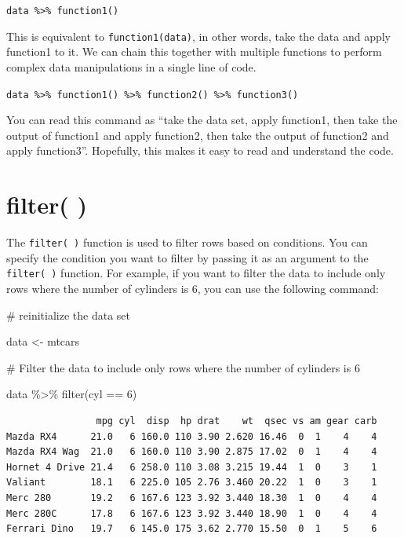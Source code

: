 \documentclass[
  letterpaper,
  DIV=11,
  numbers=noendperiod]{scrreprt}
\newenvironment{Shaded}{\begin{snugshade}}{\end{snugshade}}
\newcommand{\CommentTok}[1]{\textcolor[rgb]{0.37,0.37,0.37}{#1}}
\newcommand{\DecValTok}[1]{\textcolor[rgb]{0.68,0.00,0.00}{#1}}
\newcommand{\FunctionTok}[1]{\textcolor[rgb]{0.28,0.35,0.67}{#1}}
\newcommand{\NormalTok}[1]{\textcolor[rgb]{0.00,0.23,0.31}{#1}}
\newcommand{\OtherTok}[1]{\textcolor[rgb]{0.00,0.23,0.31}{#1}}
\newcommand{\SpecialCharTok}[1]{\textcolor[rgb]{0.37,0.37,0.37}{#1}}
\begin{document}
\texttt{data\ \%\textgreater{}\%\ function1()}

This is equivalent to \texttt{function1(data)}, in other words, take the
data and apply function1 to it. We can chain this together with multiple
functions to perform complex data manipulations in a single line of
code.

\texttt{data\ \%\textgreater{}\%\ function1()\ \%\textgreater{}\%\ function2()\ \%\textgreater{}\%\ function3()}

You can read this command as ``take the data set, apply function1, then
take the output of function1 and apply function2, then take the output
of function2 and apply function3''. Hopefully, this makes it easy to
read and understand the code.

\section*{filter( )}\label{filter}


The \texttt{filter(\ )} function is used to filter rows based on
conditions. You can specify the condition you want to filter by passing
it as an argument to the \texttt{filter(\ )} function. For example, if
you want to filter the data to include only rows where the number of
cylinders is 6, you can use the following command:

\begin{Shaded}
\begin{Highlighting}[]
\CommentTok{\# reinitialize the data set}

\NormalTok{data }\OtherTok{\textless{}{-}}\NormalTok{ mtcars}

\CommentTok{\# Filter the data to include only rows where the number of cylinders is 6}

\NormalTok{data }\SpecialCharTok{\%\textgreater{}\%}
  \FunctionTok{filter}\NormalTok{(cyl }\SpecialCharTok{==} \DecValTok{6}\NormalTok{)}
\end{Highlighting}
\end{Shaded}

\begin{verbatim}
                mpg cyl  disp  hp drat    wt  qsec vs am gear carb
Mazda RX4      21.0   6 160.0 110 3.90 2.620 16.46  0  1    4    4
Mazda RX4 Wag  21.0   6 160.0 110 3.90 2.875 17.02  0  1    4    4
Hornet 4 Drive 21.4   6 258.0 110 3.08 3.215 19.44  1  0    3    1
Valiant        18.1   6 225.0 105 2.76 3.460 20.22  1  0    3    1
Merc 280       19.2   6 167.6 123 3.92 3.440 18.30  1  0    4    4
Merc 280C      17.8   6 167.6 123 3.92 3.440 18.90  1  0    4    4
Ferrari Dino   19.7   6 145.0 175 3.62 2.770 15.50  0  1    5    6
\end{verbatim}
\end{document}
